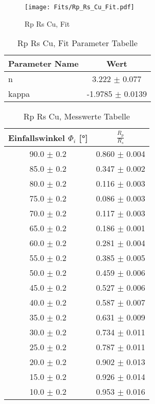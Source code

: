 \begin{figure}[ht] 
 	\centering 
 	\texttt{[image: Fits/Rp\_Rs\_Cu\_Fit.pdf]} 
	\caption{Rp Rs Cu, Fit} 
 	\label{fig:Rp Rs Cu, Fit} 
\end{figure}
 
\begin{table}[ht] 
	\centering 
	\caption{Rp Rs Cu, Fit Parameter Tabelle} 
	\label{tab: Rp Rs Cu, Fit Parameter Tabelle}
	\begin{tabular}{|l|c|}
		\hline
		Parameter Name	&	Wert \\ \hline
		n	&	 3.222 $\pm$  0.077\\ \hline
		kappa	&	-1.9785 $\pm$  0.0139\\ \hline
	\end{tabular} 
\end{table}
 
\begin{table}[ht] 
	\centering 
	\caption{Rp Rs Cu, Messwerte Tabelle} 
	\label{tab: Rp Rs Cu, Messwerte Tabelle}
	\begin{tabular}{|c|c|}
		\hline
		Einfallswinkel $\Phi_i$ [°] 	&	 $\frac{R_p}{R_s}$\\ \hline
		90.0 $\pm$ 0.2 	&	 0.860 $\pm$ 0.004 \\ \hline
		85.0 $\pm$ 0.2 	&	 0.347 $\pm$ 0.002 \\ \hline
		80.0 $\pm$ 0.2 	&	 0.116 $\pm$ 0.003 \\ \hline
		75.0 $\pm$ 0.2 	&	 0.086 $\pm$ 0.003 \\ \hline
		70.0 $\pm$ 0.2 	&	 0.117 $\pm$ 0.003 \\ \hline
		65.0 $\pm$ 0.2 	&	 0.186 $\pm$ 0.001 \\ \hline
		60.0 $\pm$ 0.2 	&	 0.281 $\pm$ 0.004 \\ \hline
		55.0 $\pm$ 0.2 	&	 0.385 $\pm$ 0.005 \\ \hline
		50.0 $\pm$ 0.2 	&	 0.459 $\pm$ 0.006 \\ \hline
		45.0 $\pm$ 0.2 	&	 0.527 $\pm$ 0.006 \\ \hline
		40.0 $\pm$ 0.2 	&	 0.587 $\pm$ 0.007 \\ \hline
		35.0 $\pm$ 0.2 	&	 0.631 $\pm$ 0.009 \\ \hline
		30.0 $\pm$ 0.2 	&	 0.734 $\pm$ 0.011 \\ \hline
		25.0 $\pm$ 0.2 	&	 0.787 $\pm$ 0.011 \\ \hline
		20.0 $\pm$ 0.2 	&	 0.902 $\pm$ 0.013 \\ \hline
		15.0 $\pm$ 0.2 	&	 0.926 $\pm$ 0.014 \\ \hline
		10.0 $\pm$ 0.2 	&	 0.953 $\pm$ 0.016 \\ \hline
	\end{tabular} 
\end{table}
 
